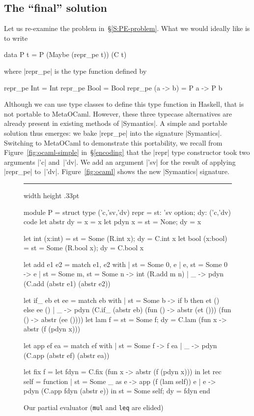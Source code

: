 \documentclass[preprint]{sigplanconf}
\newenvironment{floatrule}
    {\hrule width \hsize height .33pt \vspace{.5pc}}
    {\par\addvspace{1ex}}
\begin{document}
\subsection{The ``final'' solution}
\label{S:PE-solution}
Let us re-examine the problem in~\S\ref{S:PE-problem}. What we
would ideally like is to write
\begin{code}
data P t = P (Maybe (repr_pe t)) (C t)
\end{code}
where |repr_pe| is the type function defined
by
\begin{code}
repr_pe Int      = Int
repr_pe Bool     = Bool
repr_pe (a -> b) = P a -> P b
\end{code}
Although we can use type classes to define this type function
in Haskell, that is not portable to MetaOCaml. However,
these three typecase alternatives are already present in existing
methods of |Symantics|.
A simple and portable solution thus emerges: we bake |repr_pe| 
into the signature |Symantics|. Switching to MetaOCaml to demonstrate this
portability, we recall from Figure~\ref{fig:ocaml-simple} in~\S\ref{encoding} that the |repr| type
constructor took two arguments |'c| and~|'dv|. We add an argument
|'sv| for the result of applying |repr_pe| to~|'dv|.
Figure~\ref{fig:ocaml} shows the new |Symantics| signature.

\begin{figure}
\begin{floatrule}
\begin{code}
module P = struct
  type ('c,'sv,'dv) repr = {st: 'sv option;
                            dy: ('c,'dv) code}
  let abstr {dy = x} = x
  let pdyn x = {st = None; dy = x}

  let int  (x:int)  = {st = Some (R.int x);
                       dy = C.int x}
  let bool (x:bool) = {st = Some (R.bool x);
                       dy = C.bool x}

  let add e1 e2 = match e1, e2 with
  | {st = Some 0}, e | e, {st = Some 0} -> e
  | {st = Some m}, {st = Some n} -> int (R.add m n)
  | _ -> pdyn (C.add (abstr e1) (abstr e2))

  let if_ eb et ee = match eb with
  | {st = Some b} -> if b then et () else ee ()
  | _ -> pdyn (C.if_ (abstr eb) 
                     (fun () -> abstr (et ()))
                     (fun () -> abstr (ee ())))
  let lam f =
  {st = Some f; 
   dy = C.lam (fun x -> abstr (f (pdyn x)))}

  let app ef ea = match ef with
  | {st = Some f} -> f ea
  | _ -> pdyn (C.app (abstr ef) (abstr ea))

  let fix f = 
    let fdyn = C.fix (fun x -> abstr (f (pdyn x)))
    in let rec self = function
       | {st = Some _} as e -> app (f (lam self)) e
       | e -> pdyn (C.app fdyn (abstr e))
       in {st = Some self; dy = fdyn}
end
\end{code}
\end{floatrule}
\caption{Our partial evaluator (\texttt{mul} and \texttt{leq} are elided)}
\label{fig:pe}
\end{figure}
\end{document}
